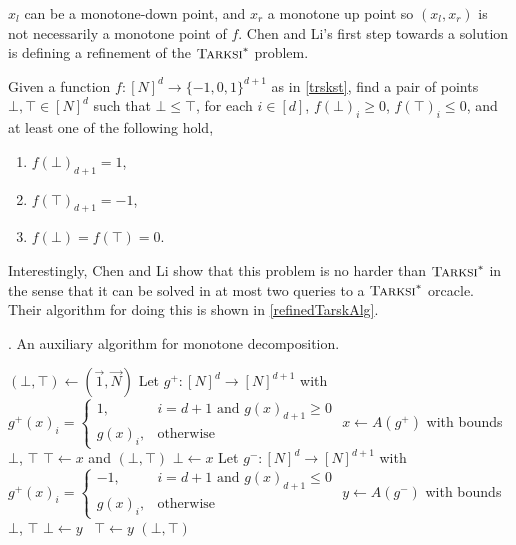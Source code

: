 $x_l$ can be a monotone-down point, and $x_r$ a monotone up point so $(x_l, x_r)$ is not necessarily
a monotone point of $f$. Chen and Li's first step towards a solution is defining a refinement of the
$\textsc{Tarksi}^*$ problem.
\begin{definition}
  Given a function $f : [N]^d \to \{-1, 0, 1\}^{d + 1}$ as in \cref{trskst}, find
  a pair of points $\bot, \top \in [N]^d$ such that $\bot \leq \top$, for each $i \in [d]$,
  $f(\bot)_i \geq 0$, $f(\top)_i \leq 0$, and at least one of the following hold,
  \begin{enumerate}
    \item $f(\bot)_{d + 1} = 1$,
    \item $f(\top)_{d + 1} = -1$,
    \item $f(\bot) = f(\top) = 0$.
  \end{enumerate}
\end{definition}
Interestingly, Chen and Li show that this problem is no harder than $\textsc{Tarksi}^*$ in the sense
that it can be solved in at most two queries to a $\textsc{Tarksi}^*$ orcacle. Their algorithm for doing this is
shown in \cref{refinedTarskAlg}.
\begin{algorithm}[H]
  \caption{\citep{chenLi}. An auxiliary algorithm for monotone decomposition.} \label{refinedTarskAlg}
  \begin{algorithmic}[1]
    \State $(\bot, \top) \gets (\vec{1}, \vec{N})$
    \State Let $g^+ : [N]^d \to [N]^{d+1}$ with $g^+(x)_i = 
      \begin{cases} 1, & i = d + 1 \text{ and } g(x)_{d + 1} \geq 0 \\ g(x)_i, & \text{otherwise}\end{cases}$
    \State $x \gets A(g^+)$ with bounds $\bot$, $\top$
    \State {} $\top \gets x$ and \Return $(\bot, \top)$ \EndIf
    \State $\bot \gets x$
  \State Let $g^- : [N]^d \to [N]^{d+1}$ with $g^+(x)_i = 
    \begin{cases} -1, & i = d + 1 \text{ and } g(x)_{d + 1} \leq 0 \\ g(x)_i, & \text{otherwise}\end{cases}$
    \State $y \gets A(g^-)$ with bounds $\bot$, $\top$
     $\bot \gets y$ \algorithmicelse\ $\top \gets y$ \EndIf
    \State \Return $(\bot, \top)$
  \EndProcedure
  \end{algorithmic}
\end{algorithm}
